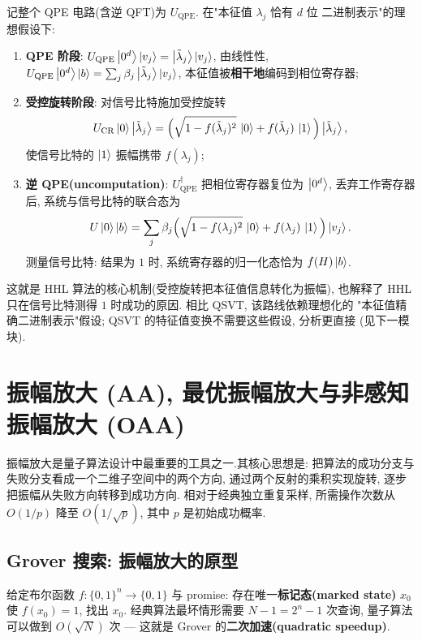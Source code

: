 \documentclass[utf8]{article} %
\numberwithin{equation}{section}   %
\newtheorem{Def}{\hskip 2em {\color{green} 定义}}[subsection]
\newtheorem{Note}{\hskip 2em {\color{red} 注}}[subsection]
\begin{document}
\begin{Note}
    记整个 QPE 电路(含逆 QFT)为 $U_{\mathrm{QPE}}$. 在"本征值 $\lambda_j$ 恰有 $d$ 位
    二进制表示"的理想假设下:
    \begin{enumerate}
        \item \textbf{QPE 阶段}: $U_{\mathrm{QPE}}\ket{0^d}\ket{v_j} = \ket{\tilde\lambda_j}\ket{v_j}$,
        由线性性, $U_{\mathrm{QPE}}\ket{0^d}\ket{b} = \sum_j \beta_j\ket{\tilde\lambda_j}\ket{v_j}$,
        本征值被\textbf{相干地}编码到相位寄存器;
        \item \textbf{受控旋转阶段}: 对信号比特施加受控旋转
        \[ U_{\mathrm{CR}}\ket{0}\ket{\tilde\lambda_j}
        = \Big(\sqrt{1 - f(\tilde\lambda_j)^2}\,\ket{0} + f(\tilde\lambda_j)\,\ket{1}\Big)\ket{\tilde\lambda_j}, \]
        使信号比特的 $\ket{1}$ 振幅携带 $f(\lambda_j)$;
        \item \textbf{逆 QPE(uncomputation)}: $U_{\mathrm{QPE}}^\dagger$ 把相位寄存器复位为
        $\ket{0^d}$, 丢弃工作寄存器后, 系统与信号比特的联合态为
        \[ U\ket{0}\ket{b} = \sum_j \beta_j\Big(\sqrt{1 - f(\lambda_j)^2}\,\ket{0}
           + f(\lambda_j)\,\ket{1}\Big)\ket{v_j}. \]
        测量信号比特: 结果为 $1$ 时, 系统寄存器的归一化态恰为 $f(H)\ket{b}$.
    \end{enumerate}
    这就是 HHL 算法的核心机制(受控旋转把本征值信息转化为振幅), 也解释了
    HHL 只在信号比特测得 $1$ 时成功的原因. 相比 QSVT, 该路线依赖理想化的
    "本征值精确二进制表示"假设; QSVT 的特征值变换不需要这些假设, 分析更直接
    (见下一模块).
\end{Note}

\section{振幅放大 (AA), 最优振幅放大与非感知振幅放大 (OAA)}
振幅放大是量子算法设计中最重要的工具之一.其核心思想是: 把算法的成功分支与失败分支看成一个二维子空间中的两个方向, 通过两个反射的乘积实现旋转, 逐步把振幅从失败方向转移到成功方向. 相对于经典独立重复采样, 所需操作次数从 $O(1/p)$ 降至 $O(1/\sqrt{p})$, 其中 $p$ 是初始成功概率. 

\subsection{Grover 搜索: 振幅放大的原型}

\begin{Def}[无结构搜索问题]
    给定布尔函数 $f: \{0,1\}^n \to \{0,1\}$ 与 promise: 存在唯一\textbf{标记态(marked state)} $x_0$ 使 $f(x_0) = 1$,
    找出 $x_0$. 经典算法最坏情形需要 $N - 1 = 2^n - 1$ 次查询, 
    量子算法可以做到 $O(\sqrt{N})$ 次 --- 这就是 Grover 的\textbf{二次加速(quadratic speedup)}.
\end{Def}
\end{document}
